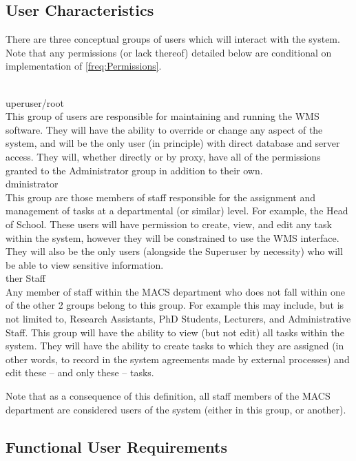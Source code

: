 \documentclass[11pt, a4paper]{article}
\def\itempar#1\\{\item \textbf{#1}\\} %
\begin{document}
\subsection{User Characteristics} \label{subsec:Users}

There are three conceptual groups of users which will interact with the system. Note that any permissions (or lack thereof) detailed below are conditional on implementation of \autoref{freq:Permissions}.

\begin{enumerate}
\itempar Superuser/root\\
This group of users are responsible for maintaining and running the WMS software. They will have the ability to override or change any aspect of the system, and will be the only user (in principle) with direct database and server access. They will, whether directly or by proxy, have all of the permissions granted to the Administrator group in addition to their own.
\itempar Administrator\\
This group are those members of staff responsible for the assignment and management of tasks at a departmental (or similar) level. For example, the Head of School. These users will have permission to create, view, and edit any task within the system, however they will be constrained to use the WMS interface. They will also be the only users (alongside the Superuser by necessity) who will be able to view sensitive information.
\itempar Other Staff\\
Any member of staff within the MACS department who does not fall within one of the other 2 groups belong to this group. For example this may include, but is not limited to, Research Assistants, PhD Students, Lecturers, and Administrative Staff. This group will have the ability to view (but not edit) all tasks within the system. They will have the ability to create tasks to which they are assigned (in other words, to record in the system agreements made by external processes) and edit these -- and only these -- tasks.

Note that as a consequence of this definition, all staff members of the MACS department are considered users of the system (either in this group, or another).
\end{enumerate}


\subsection{Functional User Requirements}
\end{document}
